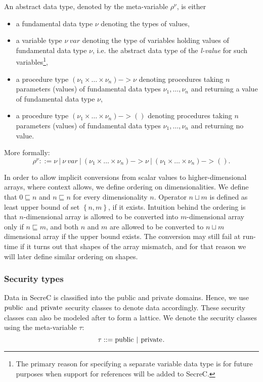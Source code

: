 \documentclass[a4paper, 10pt, draft]{report}
\newcommand{\mycode}[1]{\ensuremath{\mbox{\lstinline{#1}}}}
\begin{document}
An abstract data type, denoted by the meta-variable $\rho^\nu$, is either
\begin{itemize}
  \item
  a fundamental data type $\nu$ denoting the types of values,

  \item
  a variable type $\nu\ var$ denoting the type of variables holding values of
  fundamental data type $\nu$, i.e. the abstract data type of the
  \textit{l-value} for such variables\footnote{The primary reason for
  specifying a separate variable data type is for future purposes when
  support for references will be added to SecreC.},

  \item
  a procedure type $\left(\nu_1 \times \ldots \times \nu_n\right) -> \nu$
  denoting procedures taking $n$ parameters (values) of fundamental data types
  $\nu_1,\ldots,\nu_n$ and returning a value of fundamental data type $\nu$,

  \item
  a procedure type $\left(\nu_1 \times \ldots \times \nu_n\right) -> ()$
  denoting procedures taking $n$ parameters (values) of fundamental data types
  $\nu_1,\ldots,\nu_n$ and returning no value.
\end{itemize}
More formally:
\[ \rho^\nu ::= \nu\ |\ \nu\ var\ |\ \left(\nu_1 \times \ldots \times \nu_n\right) -> \nu\ |\ \left(\nu_1 \times \ldots \times \nu_n\right) -> (). \]

In order to allow implicit conversions from scalar values to higher-dimensional
arrays, where context allows, we define ordering on dimensionalities. We define
that $0 \sqsubseteq n$ and $n \sqsubseteq n$ for every dimensionality $n$.
Operator $n \sqcup m$ is defined as least upper bound of set $\left\{ n, m
\right\}$, if it exists. Intuition behind the ordering is that $n$-dimensional
array is allowed to be converted into $m$-dimensional array only if $n
\sqsubseteq m$, and both $n$ and $m$ are allowed to be converted to $n \sqcup
m$ dimensional array if the upper bound exists. The conversion may still fail
at run-time if it turns out that shapes of the array mismatch, and for that
reason we will later define similar ordering on shapes.

\subsubsection{Security types}
Data in SecreC is classified into the public and private domains. Hence, we use
\mycode{public} and \mycode{private} security classes to denote data
accordingly. These security classes can also be modeled after \cite{DENNING76}
to form a lattice. We denote the security classes using the meta-variable
$\tau$:
\[ \tau ::= \mycode{public}\ |\ \mycode{private}. \]
\end{document}
